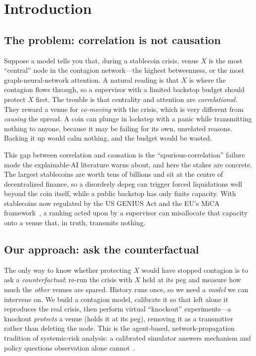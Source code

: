 \documentclass[sigconf,anonymous]{acmart}
\begin{document}
\maketitle

\section{Introduction}

\subsection{The problem: correlation is not causation}
Suppose a model tells you that, during a stablecoin crisis, venue $X$ is the most ``central'' node
in the contagion network---the highest betweenness, or the most graph-neural-network
attention. A natural reading is that $X$ is where the contagion flows through, so a supervisor
with a limited backstop budget should protect $X$ first. The trouble is that centrality and
attention are \emph{correlational}. They reward a venue for \emph{co-moving} with the crisis, which
is very different from \emph{causing} the spread. A coin can plunge in lockstep with a panic while
transmitting nothing to anyone, because it may be failing for its own, unrelated reasons. Backing it up
would calm nothing, and the budget would be wasted.

This gap between correlation and causation is the ``spurious-correlation'' failure mode the
explainable-AI literature warns about, and here the stakes are concrete. The largest stablecoins are
worth tens of billions and sit at the centre of decentralized finance, so a disorderly depeg can
trigger forced liquidations well beyond the coin itself, while a public backstop has only finite
capacity. With stablecoins now regulated by the US GENIUS Act and the EU's MiCA
framework~\cite{genius2025,mica2023}, a ranking acted upon by a supervisor can misallocate that
capacity onto a venue that, in truth, transmits nothing.

\subsection{Our approach: ask the counterfactual}
The only way to know whether protecting $X$ would have stopped contagion is to ask a
\emph{counterfactual}: re-run the crisis with $X$ held at its peg and measure how much the
\emph{other} venues are spared. History runs once, so we need a \emph{model} we can intervene on.
We build a contagion model, calibrate it so that left alone it reproduces the real crisis, then
perform virtual ``knockout'' experiments---a knockout \emph{protects} a venue (holds it at its peg),
removing it as a transmitter rather than deleting the node. This is the agent-based,
network-propagation tradition of systemic-risk analysis: a calibrated simulator answers mechanism
and policy questions observation alone cannot~\cite{gu2024spoofability,battiston2012debtrank}.
\end{document}
